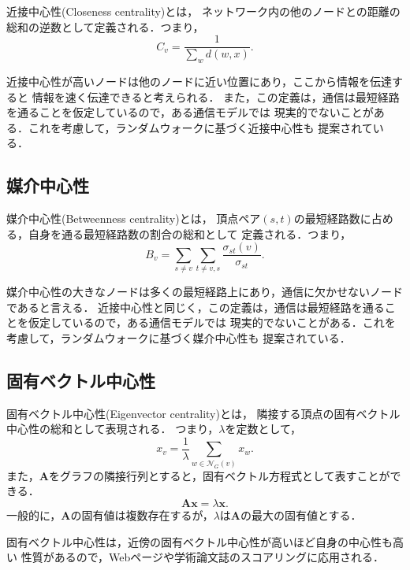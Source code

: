 近接中心性(Closeness centrality)\cite{Bavelas1948,Beauchamp1965}とは，
ネットワーク内の他のノードとの距離の総和の逆数として定義される．つまり，
\begin{equation*}
  C_v=\frac{1}{\sum_wd(w,x)}.
\end{equation*}

近接中心性が高いノードは他のノードに近い位置にあり，ここから情報を伝達すると
情報を速く伝達できると考えられる．
また，この定義は，通信は最短経路を通ることを仮定しているので，ある通信モデルでは
現実的でないことがある．これを考慮して，ランダムウォークに基づく近接中心性も
提案されている．

\subsection{媒介中心性}
\label{subsect:betweenness}

媒介中心性(Betweenness centrality)\cite{Anthonisse1971,Freeman1977}とは，
頂点ペア$(s,t)$の最短経路数に占める，自身を通る最短経路数の割合の総和として
定義される．つまり，
\begin{equation*}
  B_v=\sum_{s\neq v}\sum_{t\neq {v,s}}\frac{\sigma_{st}(v)}{\sigma_{st}}.
\end{equation*}

媒介中心性の大きなノードは多くの最短経路上にあり，通信に欠かせないノードであると言える．
近接中心性と同じく，この定義は，通信は最短経路を通ることを仮定しているので，ある通信モデルでは
現実的でないことがある．これを考慮して，ランダムウォークに基づく媒介中心性も
提案されている．

\subsection{固有ベクトル中心性}
\label{subsect:eigenvector}

固有ベクトル中心性(Eigenvector centrality)\cite{Bonacich1991}とは，
隣接する頂点の固有ベクトル中心性の総和として表現される．
つまり，$\lambda$を定数として，
\begin{equation*}
  x_v=\frac{1}{\lambda}\sum_{w\in\mathcal{N}_G(v)}x_w.
\end{equation*}
また，$\mathbf{A}$をグラフの隣接行列とすると，固有ベクトル方程式として表すことができる．
\begin{equation*}
  \mathbf{A}\mathbf{x}=\lambda\mathbf{x}.
\end{equation*}
一般的に，$\mathbf{A}$の固有値は複数存在するが，$\lambda$は$\mathbf{A}$の最大の固有値とする．

固有ベクトル中心性は，近傍の固有ベクトル中心性が高いほど自身の中心性も高い
性質があるので，Webページや学術論文誌のスコアリングに応用される．

